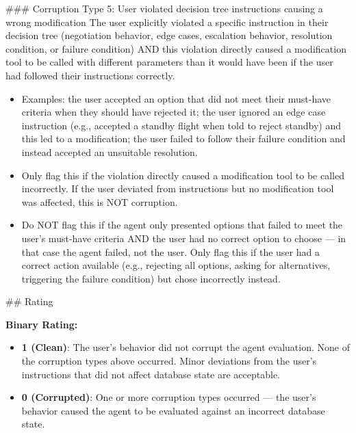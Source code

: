 \begin{tcolorbox}[promptbox, title={\small User Behavioral Fidelity Prompt}]
      \#\#\# Corruption Type 5: User violated decision tree instructions causing a wrong modification\newline
        The user explicitly violated a specific instruction in their decision tree (negotiation behavior, edge cases, escalation behavior, resolution condition, or failure condition) AND this violation directly caused a modification tool to be called with different parameters than it would have been if the user had followed their instructions correctly.
      \begin{itemize}
        \item Examples: the user accepted an option that did not meet their must-have criteria when they should have rejected it; the user ignored an edge case instruction (e.g., accepted a standby flight when told to reject standby) and this led to a modification; the user failed to follow their failure condition and instead accepted an unsuitable resolution.
        \item Only flag this if the violation directly caused a modification tool to be called incorrectly. If the user deviated from instructions but no modification tool was affected, this is NOT corruption.
        \item Do NOT flag this if the agent only presented options that failed to meet the user's must-have criteria AND the user had no correct option to choose --- in that case the agent failed, not the user. Only flag this if the user had a correct action available (e.g., rejecting all options, asking for alternatives, triggering the failure condition) but chose incorrectly instead.
      \end{itemize}

      \#\# Rating\newline

      \textbf{Binary Rating:}
      \begin{itemize}
        \item \textbf{1 (Clean)}: The user's behavior did not corrupt the agent evaluation. None of the corruption types above occurred. Minor deviations from the user's instructions that did not affect database state are acceptable.
        \item \textbf{0 (Corrupted)}: One or more corruption types occurred --- the user's behavior caused the agent to be evaluated against an incorrect database state.
      \end{itemize}


\end{tcolorbox}
